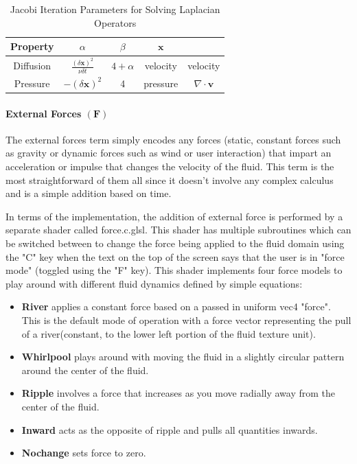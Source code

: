 \documentclass[conference]{IEEEtran}
\begin{document}
\begin{table}[htbp]
\caption{Jacobi Iteration Parameters for Solving Laplacian Operators}
\begin{center}

	\begin{tabular}{|c|c|c|c|c|}\hline
		Property & $\alpha$  & $\beta$  & $\mathbf{x}$  & \mathbf{b} \\\hline
		Diffusion & $\frac{(\delta \mathbf{x})^2}{\nu\delta t}$ & $4 + \alpha$ & velocity  & velocity \\\hline
		Pressure & $-(\delta \mathbf{x})^2$  & 4 & pressure & $\nabla \cdot \mathbf{v}$  \\\hline
	\end{tabular}
\label{termdesc}
\end{center}
\end{table}

\paragraph{External Forces $(\mathbf{F})$} The external forces term simply encodes any forces (static, constant forces such as gravity or dynamic forces such as wind or user interaction) that impart an acceleration or impulse that changes the velocity of the fluid. This term is the most straightforward of them all since it doesn't involve any complex calculus and is a simple addition based on time.

In terms of the implementation, the addition of external force is performed by a separate shader called force.c.glsl. This shader has multiple subroutines which can be switched between to change the force being applied to the fluid domain using the "C" key when the text on the top of the screen says that the user is in "force mode" (toggled using the "F" key). This shader implements four force models to play around with different fluid dynamics defined by simple equations:

\begin{itemize}
	\item \textbf{River} applies a constant force based on a passed in uniform vec4 "force". This is the default mode of operation with a force vector representing the pull of a river(constant, to the lower left portion of the fluid texture unit).

	\item \textbf{Whirlpool} plays around with moving the fluid in a slightly circular pattern around the center of the fluid.

	\item \textbf{Ripple} involves a force that increases as you move radially away from the center of the fluid.

	\item \textbf{Inward} acts as the opposite of ripple and pulls all quantities inwards.

	\item \textbf{Nochange} sets force to zero.
	
\end{itemize}
\end{document}
